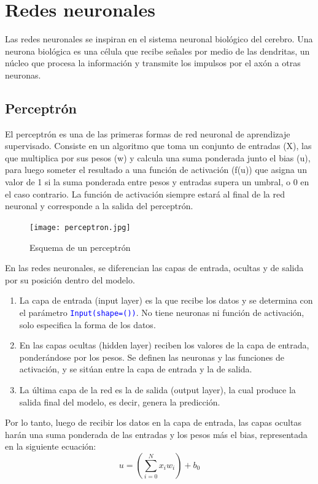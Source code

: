 \documentclass[a4paper, 12pt]{book}
\begin{document}
\chapter{Redes neuronales}
Las redes neuronales se inspiran en el sistema neuronal biológico del cerebro. Una neurona biológica es una célula que recibe señales por medio de las dendritas, un núcleo que procesa la información y transmite los impulsos por el axón a otras neuronas.
\section{Perceptrón}
El perceptrón es una de las primeras formas de red neuronal de aprendizaje supervisado. Consiste en un algoritmo que toma un conjunto de entradas (X), las que multiplica por sus pesos (w) y calcula una suma ponderada junto el bias (u), para luego someter el resultado a una función de activación (f(u)) que asigna un valor de 1 si la suma ponderada entre pesos y entradas supera un umbral, o 0 en el caso contrario. La función de activación siempre estará al final de la red neuronal y corresponde a la salida del perceptrón.
\begin{figure}[H] 
	\centering 
	\texttt{[image: perceptron.jpg]}
	\caption{Esquema de un perceptrón}
\end{figure}

En las redes neuronales, se diferencian las capas de entrada, ocultas y de salida por su posición dentro del modelo.
\begin{enumerate}
	\item La capa de entrada (input layer) es la que recibe los datos y se determina con el parámetro \texttt{\textcolor{blue}{Input(shape=())}}. No tiene neuronas ni función de activación, solo especifica la forma de los datos.
	\item En las capas ocultas (hidden layer) reciben los valores de la capa de entrada, ponderándose por los pesos. Se definen las neuronas y las funciones de activación, y se sitúan entre la capa de entrada y la de salida.
	\item La última capa de la red es la de salida (output layer), la cual produce la salida final del modelo, es decir, genera la predicción.
\end{enumerate}

Por lo tanto, luego de recibir los datos en la capa de entrada, las capas ocultas harán una suma ponderada de las entradas y los pesos más el bias, representada en la siguiente ecuación:
\begin{equation}
	u=(\sum_{i=0}^{N}x_{i}w_{i})+b_{0}
\end{equation}
\end{document}
